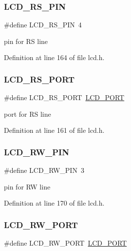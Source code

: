 \subsubsection{\texorpdfstring{LCD\_RS\_PIN}{LCD\_RS\_PIN}}
{\footnotesize\ttfamily \#define L\+C\+D\+\_\+\+R\+S\+\_\+\+P\+IN~4}

pin for RS line 

Definition at line 164 of file lcd.\+h.

\mbox{\label{group__pfleury__lcd_gac5be2a22727fd9ca349e1c9bcbfbcd47}} 
\subsubsection{\texorpdfstring{LCD\_RS\_PORT}{LCD\_RS\_PORT}}
{\footnotesize\ttfamily \#define L\+C\+D\+\_\+\+R\+S\+\_\+\+P\+O\+RT~\mbox{\hyperlink{group__pfleury__lcd_gabcf42bd88b3c36193f301ca25b033875}{L\+C\+D\+\_\+\+P\+O\+RT}}}

port for RS line 

Definition at line 161 of file lcd.\+h.

\mbox{\label{group__pfleury__lcd_ga3ac938dd5fc02a9a232df6605b5f6aa8}} 
\subsubsection{\texorpdfstring{LCD\_RW\_PIN}{LCD\_RW\_PIN}}
{\footnotesize\ttfamily \#define L\+C\+D\+\_\+\+R\+W\+\_\+\+P\+IN~3}

pin for RW line 

Definition at line 170 of file lcd.\+h.

\mbox{\label{group__pfleury__lcd_gae8772bdf31db863b81805c837bdc2da2}} 
\subsubsection{\texorpdfstring{LCD\_RW\_PORT}{LCD\_RW\_PORT}}
{\footnotesize\ttfamily \#define L\+C\+D\+\_\+\+R\+W\+\_\+\+P\+O\+RT~\mbox{\hyperlink{group__pfleury__lcd_gabcf42bd88b3c36193f301ca25b033875}{L\+C\+D\+\_\+\+P\+O\+RT}}}

